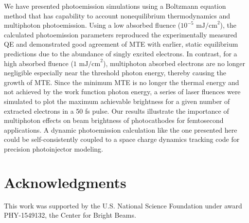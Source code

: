 We have presented photoemission simulations using a  Boltzmann equation method that has capability to account nonequilibrium thermodynamics and multiphoton photoemission. Using a low absorbed fluence ($10^{-5} \textrm{ mJ/cm}^2$), the calculated photoemission parameters reproduced the experimentally measured QE and demonstrated good agreement of MTE with earlier, static equilibrium predictions due to the abundance of singly excited electrons. In contrast, for a high absorbed fluence ($1 \textrm{ mJ/cm}^2$), multiphoton absorbed electrons are no longer negligible especially near the threshold photon energy, thereby causing the growth of MTE. Since the minimum MTE is no longer the thermal energy and not achieved by the work function photon energy, a series of laser fluences were simulated to plot the maximum achievable brightness for a given number of extracted electrons in a 50 fs pulse.  Our results illustrate the importance of multiphoton effects on beam brightness of photocathodes for femtosecond applications. A dynamic photoemission calculation like the one presented here could be self-consistently coupled to a space charge dynamics tracking code for precision photoinjector modeling. 






\section{Acknowledgments}
This work was supported by the U.S. National Science Foundation under award PHY-1549132, the Center for Bright Beams.
